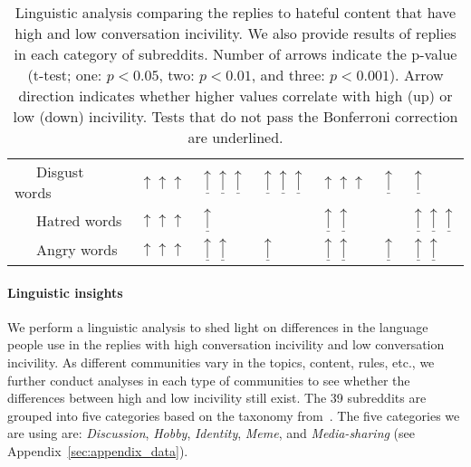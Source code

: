 \documentclass[11pt]{article}
\begin{document}
\begin{table*}
\begin{tabular}{l P{.5in}P{.5in}P{.5in}P{.5in}P{.5in}P{.5in}}
			~~~Disgust words & $\uparrow\uparrow\uparrow$ & $\underline\uparrow\underline\uparrow\underline\uparrow$ & $\underline\uparrow\underline\uparrow\underline\uparrow$ & $\uparrow\uparrow\uparrow$  &  $\underline\uparrow$ & $\underline\uparrow$ \\
			~~~Hatred words & $\uparrow\uparrow\uparrow$ & $\underline\uparrow$ & & $\underline\uparrow\underline\uparrow$ & &  $\underline\uparrow\underline\uparrow\underline\uparrow$ \\
			~~~Angry words &  $\uparrow\uparrow\uparrow$ & $\underline\uparrow\underline\uparrow$ & $\underline\uparrow$ & $\underline\uparrow\underline\uparrow$ & $\underline\uparrow$ & $\underline\uparrow\underline\uparrow$ \\
			\bottomrule
		\end{tabular}
		
		\caption{Linguistic analysis comparing the replies to hateful content that have high and low conversation incivility.
			We also provide results of replies in each category of subreddits.
			Number of arrows indicate the p-value (t-test; one: $p<0.05$, two: $p<0.01$, and three: $p<0.001$).
			Arrow direction indicates whether higher values correlate with high (up) or low (down) incivility. 
			Tests that do not pass the Bonferroni correction are underlined.}
		\label{t:linguistic}
	\end{table*}
	
	\paragraph{Linguistic insights} 
	We perform a linguistic analysis to shed light on differences in the language people use in the replies with high conversation incivility and low conversation incivility.
	As different communities vary in the topics, content, rules, etc., 
	we further conduct analyses in each type of communities to see whether the differences between high and low incivility still exist.
	The 39 subreddits are grouped into five categories based on the taxonomy from~\citet{Weld_Zhang_Althoff_2022}.
	The five categories we are using are: \emph{Discussion}, \emph{Hobby}, \emph{Identity}, \emph{Meme}, and \emph{Media-sharing} (see Appendix~\ref{sec:appendix_data}).
	
\end{document}
